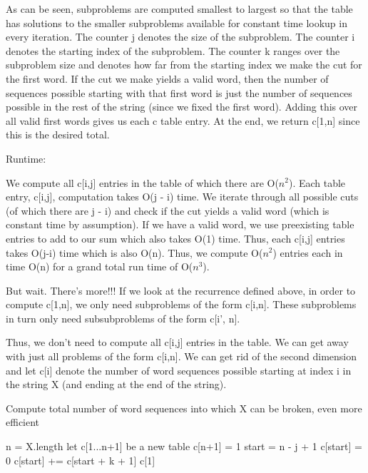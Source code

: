 \documentclass[11pt,a4paper]{article}
\begin{document}
As can be seen, subproblems are computed smallest to largest so that the table has solutions to the smaller subproblems available for constant time lookup in every iteration. The counter j denotes the size of the subproblem. The counter i denotes the starting index of the subproblem. The counter k ranges over the subproblem size and denotes how far from the starting index we make the cut for the first word. If the cut we make yields a valid word, then the number of sequences possible starting with that first word is just the number of sequences possible in the rest of the string (since we fixed the first word). Adding this over all valid first words gives us each c table entry. At the end, we return c[1,n] since this is the desired total. 

Runtime:

We compute all c[i,j] entries in the table of which there are O($n^{2}$). Each table entry, c[i,j], computation takes O(j - i) time. We iterate through all possible cuts (of which there are j - i) and check if the cut yields a valid word (which is constant time by assumption). If we have a valid word, we use preexisting table entries to add to our sum which also takes O(1) time. Thus, each c[i,j] entries takes O(j-i) time which is also O(n). Thus, we compute O($n^{2}$) entries each in time O(n) for a grand total run time of O($n^{3}$).

But wait. There's more!!! If we look at the recurrence defined above, in order to compute c[1,n], we only need subproblems of the form c[i,n]. These subproblems in turn only need subsubproblems of the form c[i', n].

Thus, we don't need to compute all c[i,j] entries in the table. We can get away with just all problems of the form c[i,n]. We can get rid of the second dimension and let c[i] denote the number of word sequences possible starting at index i in the string X (and ending at the end of the string).

\begin{algorithm}
\caption{Compute total number of word sequences into which X can be broken, even more efficient}
\begin{algorithmic}[1]
	\State n = X.length
	\State let c[1...n+1] be a new table
	\State c[n+1] = 1
	  
		\State start = n - j + 1
			\State c[start] = 0  
			  
					\State c[start] += c[start + k + 1]
				\EndIf
			\EndFor
	\EndFor
	\State \Return c[1]
\EndFunction
\end{algorithmic}
\end{algorithm}
\end{document}
